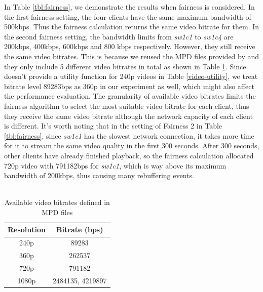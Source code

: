 \documentclass[12pt]{article}
\begin{document}
In Table \ref{tbl:fairness}, we demonstrate the results when fairness is considered. In the first fairness setting, the four clients have the same maximum bandwidth of 500kbps. Thus the fairness calculation returns the same video bitrate for them. In the second fairness setting, the bandwidth limits from \textit{sw1c1} to \textit{sw1c4} are 200kbps, 400kbps, 600kbps and 800 kbps respectively. However, they still receive the same video bitrates. This is because we reused the MPD files provided by \cite{bhat_network_2017} and they only include 5 different video bitrates in total as shown in Table \ref{tbl:mpd_bitrate}. Since \cite{mu_scalable_2016} doesn't provide a utility function for 240p videos in Table \ref{video-utility}, we treat bitrate level 89283bps as 360p in our experiment as well, which might also affect the performance evaluation. The granularity of available video bitrates limits the fairness algorithm to select the most suitable video bitrate for each client, thus they receive the same video bitrate although the network capacity of each client is different. It's worth noting that in the setting of Fairness 2 in Table \ref{tbl:fairness}, since \textit{sw1c1} has the slowest network connection, it takes more time for it to stream the same video quality in the first 300 seconds. After 300 seconds, other clients have already finished playback, so the fairness calculation allocated 720p video with 791182bps for \textit{sw1c1}, which is way above its maximum bandwidth of 200kbps, thus causing many rebuffering events.
\\~\\

\begin{table}[H]
    \centering
    \begin{tabular}{|c|c|}
    \hline Resolution & Bitrate (bps) \\ \hline
       240p & 89283 \\ 
       360p & 262537 \\
       720p & 791182 \\
       1080p & 2484135, 4219897 \\
       \hline 
    \end{tabular}
    \caption{Available video bitrates defined in MPD files}
    \label{tbl:mpd_bitrate}
\end{table}
\end{document}
